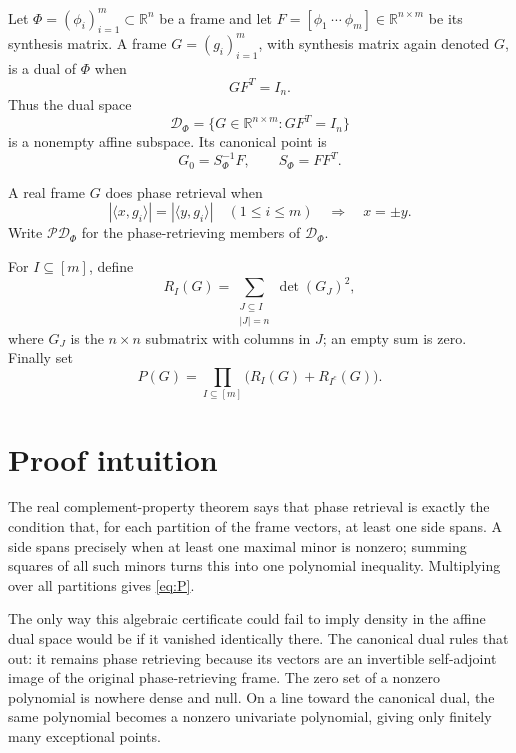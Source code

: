 \documentclass[11pt]{article}
\newcommand{\R}{\mathbb R}
\newcommand{\cD}{\mathcal D}
\newcommand{\cP}{\mathcal P}
\begin{document}
Let $\Phi=(\phi_i)_{i=1}^m\subset\R^n$ be a frame and let
$F=[\phi_1\ \cdots\ \phi_m]\in\R^{n\times m}$ be its synthesis matrix.  A
frame $G=(g_i)_{i=1}^m$, with synthesis matrix again denoted $G$, is a dual of
$\Phi$ when
\begin{equation}\label{eq:dual-affine}
 GF^T=I_n.
\end{equation}
Thus the dual space
\[
 \cD_\Phi=\{G\in\R^{n\times m}:GF^T=I_n\}
\]
is a nonempty affine subspace.  Its canonical point is
\begin{equation}\label{eq:canonical}
 G_0=S_\Phi^{-1}F,\qquad S_\Phi=FF^T.
\end{equation}

A real frame $G$ does phase retrieval when
\[
 |\langle x,g_i\rangle|=|\langle y,g_i\rangle|\quad(1\le i\le m)
 \quad\Longrightarrow\quad x=\pm y.
\]
Write $\cP\cD_\Phi$ for the phase-retrieving members of $\cD_\Phi$.

For $I\subseteq[m]$, define
\begin{equation}\label{eq:RI}
 R_I(G)=\sum_{\substack{J\subseteq I\\|J|=n}}
 \det(G_J)^2,
\end{equation}
where $G_J$ is the $n\times n$ submatrix with columns in $J$; an empty sum is
zero.  Finally set
\begin{equation}\label{eq:P}
 P(G)=\prod_{I\subseteq[m]}\bigl(R_I(G)+R_{I^c}(G)\bigr).
\end{equation}

\section{Proof intuition}

The real complement-property theorem says that phase retrieval is exactly the
condition that, for each partition of the frame vectors, at least one side
spans.  A side spans precisely when at least one maximal minor is nonzero;
summing squares of all such minors turns this into one polynomial inequality.
Multiplying over all partitions gives \eqref{eq:P}.

The only way this algebraic certificate could fail to imply density in the
affine dual space would be if it vanished identically there.  The canonical
dual rules that out: it remains phase retrieving because its vectors are an
invertible self-adjoint image of the original phase-retrieving frame.  The
zero set of a nonzero polynomial is nowhere dense and null.  On a line toward
the canonical dual, the same polynomial becomes a nonzero univariate
polynomial, giving only finitely many exceptional points.
\end{document}
